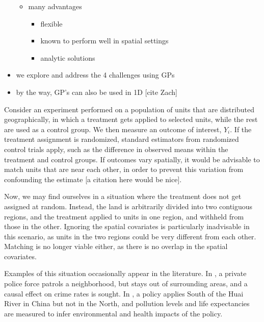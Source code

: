 \documentclass[letter]{article}
\providecommand{\tightlist}{%
      \setlength{\itemsep}{0pt}\setlength{\parskip}{0pt}}
\providecommand{\tightlist}{%
  	  \setlength{\itemsep}{0pt}\setlength{\parskip}{0pt}}
\renewcommand{\cite}[1]{\citep{#1}}
\begin{document}
\begin{itemize}
  \begin{itemize}
  \tightlist
  \item
    many advantages

    \begin{itemize}
    \tightlist
    \item
      flexible
    \item
      known to perform well in spatial settings
    \item
      analytic solutions
    \end{itemize}
  \end{itemize}
\item
  we explore and address the 4 challenges using GPs
\item
  by the way, GP's can also be used in 1D {[}cite Zach{]}
\end{itemize}
    


    	Consider an experiment performed on a population of units that are distributed geographically,
in which a treatment gets applied to selected units, while the rest are used as a control group.
We then measure an outcome of interest, \(Y_i\).
If the treatment assignment is randomized, standard estimators from randomized control trials apply, such as the difference in observed means within the treatment and control groups.
If outcomes vary spatially, it would be advisable to match units that are near each other, in order to prevent this variation from confounding the estimate {[}a citation here would be nice{]}.

Now, we may find ourselves in a situation where the treatment does not get assigned at random.
Instead, the land is arbitrarily divided into two contiguous regions, and the treatment applied to units in one region, and withheld from those in the other.
Ignoring the spatial covariates is particularly inadvisable in this scenario, as units in the two regions could be very different from each other.
Matching is no longer viable either, as there is no overlap in the spatial covariates.

Examples of this situation occasionally appear in the literature. In \cite{macdonald2015effect}, a private police force patrols a neighborhood, but stays out of surrounding areas, and a causal effect on crime rates is sought. In \cite{chen2013evidence}, a policy applies South of the Huai River in China but not in the North, and pollution levels and life expectancies are measured to infer environmental and health impacts of the policy.
\end{document}

